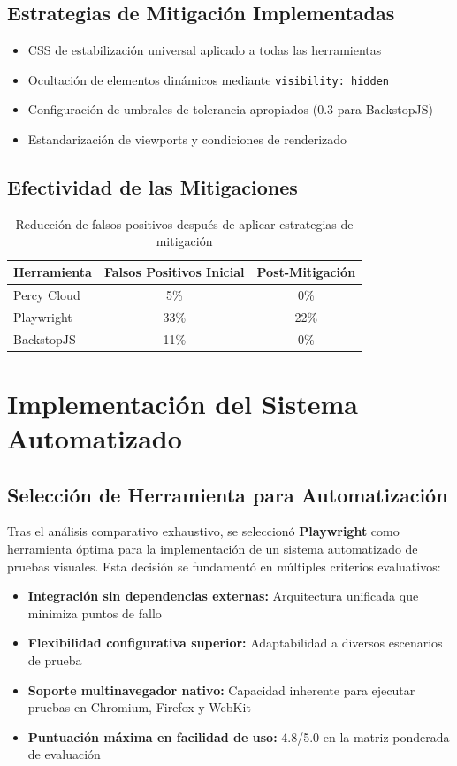 \documentclass{article}
\begin{document}
\subsection{Estrategias de Mitigación Implementadas}
\begin{itemize}[nosep]
\item CSS de estabilización universal aplicado a todas las herramientas
\item Ocultación de elementos dinámicos mediante \texttt{visibility: hidden}
\item Configuración de umbrales de tolerancia apropiados (0.3 para BackstopJS)
\item Estandarización de viewports y condiciones de renderizado
\end{itemize}

\subsection{Efectividad de las Mitigaciones}
\begin{table}[H]
\centering
\begin{tabular}{|l|c|c|}
\hline
\textbf{Herramienta} & \textbf{Falsos Positivos Inicial} & \textbf{Post-Mitigación} \\
\hline
Percy Cloud & 5\% & 0\% \\
Playwright & 33\% & 22\% \\
BackstopJS & 11\% & 0\% \\
\hline
\end{tabular}
\caption{Reducción de falsos positivos después de aplicar estrategias de mitigación}
\label{tab:false-positives}
\end{table}

\section{Implementación del Sistema Automatizado}

\subsection{Selección de Herramienta para Automatización}
Tras el análisis comparativo exhaustivo, se seleccionó \textbf{Playwright} como herramienta óptima para la implementación de un sistema automatizado de pruebas visuales. Esta decisión se fundamentó en múltiples criterios evaluativos:

\begin{itemize}[nosep]
\item \textbf{Integración sin dependencias externas:} Arquitectura unificada que minimiza puntos de fallo
\item \textbf{Flexibilidad configurativa superior:} Adaptabilidad a diversos escenarios de prueba
\item \textbf{Soporte multinavegador nativo:} Capacidad inherente para ejecutar pruebas en Chromium, Firefox y WebKit
\item \textbf{Puntuación máxima en facilidad de uso:} 4.8/5.0 en la matriz ponderada de evaluación
\end{itemize}
\end{document}
